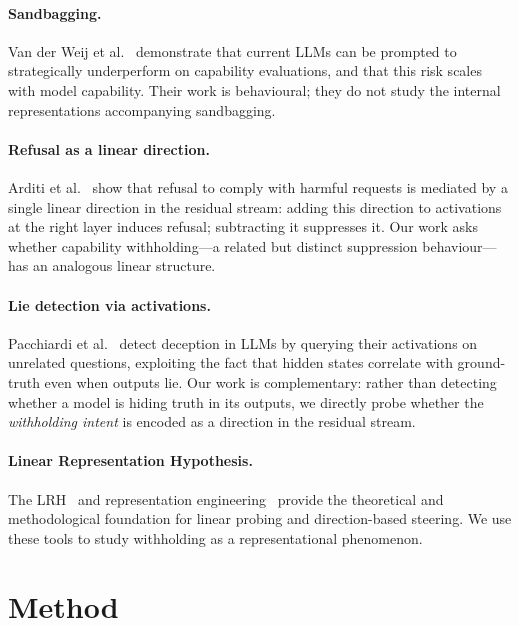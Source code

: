 \documentclass{article}
\begin{document}
\paragraph{Sandbagging.}
Van der Weij et al.~\citep{vanderweij2024sandbagging} demonstrate that current LLMs can be prompted to strategically underperform on capability evaluations, and that this risk scales with model capability.
Their work is behavioural; they do not study the internal representations accompanying sandbagging.

\paragraph{Refusal as a linear direction.}
Arditi et al.~\citep{arditi2024refusal} show that refusal to comply with harmful requests is mediated by a single linear direction in the residual stream: adding this direction to activations at the right layer induces refusal; subtracting it suppresses it.
Our work asks whether capability withholding---a related but distinct suppression behaviour---has an analogous linear structure.

\paragraph{Lie detection via activations.}
Pacchiardi et al.~\citep{pacchiardi2023catch} detect deception in LLMs by querying their activations on unrelated questions, exploiting the fact that hidden states correlate with ground-truth even when outputs lie.
Our work is complementary: rather than detecting whether a model is hiding truth in its outputs, we directly probe whether the \emph{withholding intent} is encoded as a direction in the residual stream.

\paragraph{Linear Representation Hypothesis.}
The LRH~\citep{park2024linear} and representation engineering~\citep{zou2023representation} provide the theoretical and methodological foundation for linear probing and direction-based steering.
We use these tools to study withholding as a representational phenomenon.

\section{Method}
\label{sec:method}
\end{document}
